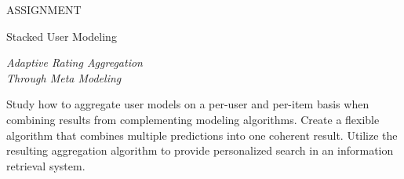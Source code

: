 \null\vspace{6em}

{
  \centering
  \color{gray}
  ASSIGNMENT
  \color{black}
  \vspace{1em}
  
  \LARGE{Stacked User Modeling}\\
  \vspace{1em}
  
  \itshape
  \large{Adaptive Rating Aggregation}\\
  \large{Through Meta Modeling}\\
}

\vspace{3em}

Study how to aggregate user models on a per-user and per-item
basis when combining results from complementing modeling algorithms.
Create a flexible algorithm that combines multiple predictions
into one coherent result.
Utilize the resulting aggregation algorithm
to provide personalized search in an information retrieval system.

\vfill

